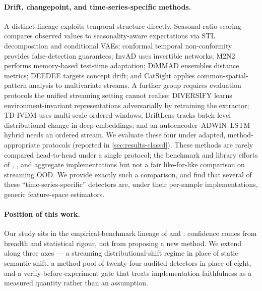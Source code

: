 \documentclass[11pt]{article}
\begin{document}
\paragraph{Drift, changepoint, and time-series-specific methods.}
A distinct lineage exploits temporal structure directly. Seasonal-ratio scoring
\citep{Belkhouja2023} compares observed values to seasonality-aware expectations via
STL decomposition and conditional VAEs; conformal temporal non-conformity
\citep{Kaur2023} provides false-detection guarantees; InvAD \citep{InvAD2025}
uses invertible networks; M2N2 \citep{M2N22024} performs memory-based test-time
adaptation; DiMMAD \citep{DiMMAD2025} ensembles distance metrics; DEEDEE
\citep{DEEDEE2025} targets concept drift; and CatSight \citep{CatSight2023} applies
common-spatial-pattern analysis to multivariate streams. A further group requires
evaluation protocols the unified streaming setting cannot realise: DIVERSIFY
\citep{Lu2024} learns environment-invariant representations adversarially by
retraining the extractor; TD-IVDM \citep{TDIVDM2025} uses multi-scale ordered windows;
DriftLens \citep{Greco2025} tracks batch-level distributional change in deep
embeddings; and an autoencoder--ADWIN--LSTM hybrid \citep{AEADWINLSTM2025} needs an
ordered stream. We evaluate these four under adapted, method-appropriate protocols
(reported in \cref{sec:results-classd}). These methods are rarely compared head-to-head
under a single protocol; the benchmark and library efforts of \citet{Zhang2023},
\citet{VanLooveren2020}, and \citet{Montiel2021} aggregate implementations but not a
fair like-for-like comparison on streaming OOD. We provide exactly such a
comparison, and find that several of these ``time-series-specific'' detectors are,
under their per-sample implementations, generic feature-space estimators.

\paragraph{Position of this work.}
Our study sits in the empirical-benchmark lineage of \citet{LiuTSBAutoAD2025} and
\citet{Gungor2025}: confidence comes from breadth and statistical rigour, not from
proposing a new method. We extend \citet{Gungor2025} along three axes --- a
streaming distributional-shift regime in place of static semantic shift, a method
pool of twenty-four audited detectors in place of eight, and a verify-before-experiment gate
that treats implementation faithfulness as a measured quantity rather than an
assumption.
\end{document}
